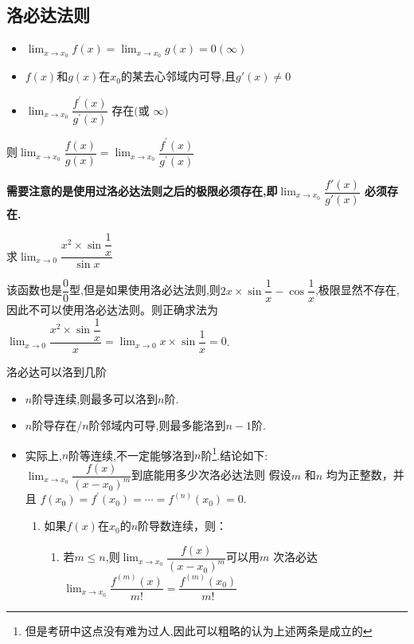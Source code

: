 \documentclass[10pt, a4paper, oneside, UTF8]{ctexbook}
\begin{document}
\begin{sloppypar}
    \subsection{洛必达法则}
    \begin{defn}{}{}
        \begin{itemize}
            \item $\lim_{x\to x_0}f(x)=\lim_{x\to x_0}g(x)=0(\infty)$
            \item $f(x)$和$g(x)$在$x_0$的某去心邻域内可导,且$g'(x) \neq 0$
            \item $\lim_{x\to x_0}\dfrac{f^{\prime}(x)}{g^{\prime}(x)}\text{ 存在(或 }\infty)$
        \end{itemize}
        则$\lim_{x\to x_{0}}\dfrac{f(x)}{g(x)}=\lim_{x\to x_{0}}\dfrac{f^{'}(x)}{g^{'}(x)}$
    \end{defn}
    \textbf{需要注意的是使用过洛必达法则之后的极限必须存在,即$\lim _{x \to x_0}\dfrac{f'(x)}{g'(x)}$ 必须存在.}
    \begin{problem}
    求$\lim _{x \to 0}\dfrac{x^2 \times \sin \dfrac{1}{x}}{\sin x}$
    \end{problem}
    \begin{solution}
        该函数也是$\dfrac{0}{0}$型,但是如果使用洛必达法则,则$2x \times \sin \dfrac{1}{x}-\cos \dfrac{1}{x}$,极限显然不存在,因此不可以使用洛必达法则。则正确求法为$\lim _{x\to 0}\dfrac{x^2\times \sin \dfrac{1}{x}}{x}=\lim_{x\to 0}x\times\sin\dfrac{1}{x}=0$.
    \end{solution}
    \begin{criterion}{洛必达可以洛到几阶}{}
        \begin{itemize}
            \item $n$阶导连续,则最多可以洛到$n$阶.
            \item $n$阶导存在/$n$阶邻域内可导,则最多能洛到$n-1$阶.
            \item 实际上,$n$阶等连续,不一定能够洛到$n$阶\footnote{但是考研中这点没有难为过人,因此可以粗略的认为上述两条是成立的}.结论如下:\\
            $\lim_{x\to x_0}\dfrac{f(x)}{\left(x-x_0\right)^m}$到底能用多少次洛必达法则
            假设$m$ 和$n$ 均为正整数，并且 $f(x_0)=f^{\prime}(x_0)=\cdots=f^{(n)}(x_0)=0.$ 
            \begin{enumerate}
                \item 如果$f(x)$在$x_0$的$n$阶导数连续，则：
                    \begin{enumerate}
                        \item 若$m{\leqslant}n$,则$\lim_{x\to x_0}\dfrac{f(x)}{\left(x-x_0\right)^m}$可以用$m$ 次洛必达$\lim_{x\to x_0}\dfrac{f^{(m)}\left(x\right)}{m!}=\dfrac{f^{(m)}\left(x_0\right)}{m!}$

\end{enumerate}
\end{enumerate}
\end{itemize}
\end{criterion}
\end{sloppypar}
\end{document}
